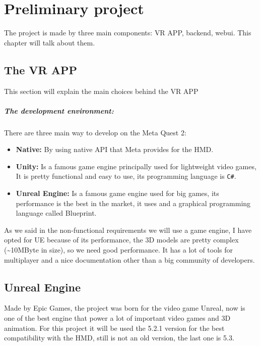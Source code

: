 
\chapter{Preliminary project}
\noindent
The project is made by three main components: \ac{VR} APP, backend, webui. This chapter will talk about them.
\section{The VR APP}
\noindent
This section will explain the main choices behind the \ac{VR} APP
\paragraph{The development environment:} 
There are three main way to develop on the Meta Quest 2:

\begin{itemize}
  \item \textbf{Native:} By using native \ac{API} that Meta provides for the \ac{HMD}.
  \item \textbf{Unity:} Is a famous game engine principally used for lightweight video games, It is pretty functional and easy to use, its programming language is \verb|C#|. 
  \item \textbf{Unreal Engine:} Is a famous game engine used for big games, its performance is the best in the market, it uses \cpp and a graphical programming language called Blueprint. 
\end{itemize}
\noindent
As we said in the non-functional requirements we will use a game engine, I have opted for \ac{UE} because of its performance, the 3D models are pretty complex (\textasciitilde10MByte in size),
so we need good performance.
It has a lot of tools for multiplayer and a nice documentation other than a big community of developers.

\section{Unreal Engine}
\noindent
Made by Epic Games, the project was born for the video game Unreal, now is one of the best engine that power a lot of important video games and 3D animation.
For this project it will be used the 5.2.1 version for the best compatibility with the \ac{HMD}, still is not an old version, the last one is 5.3. 

